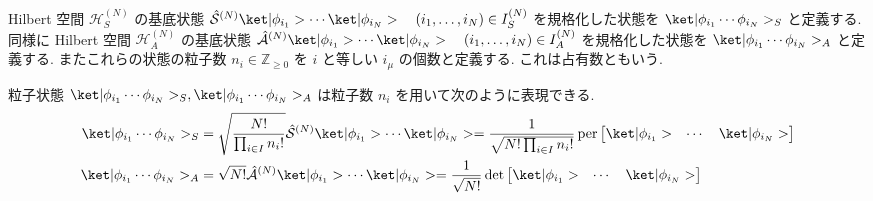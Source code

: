 \documentclass[uplatex,dvipdfmx,a4paper,11pt]{jlreq}
\DeclareMathOperator{\per}{per}
\newcommand{\ZZ}{\mathbb{Z}}
\newcommand{\HH}{\mathcal{H}}
\renewcommand{\S}{\mathcal{S}}
\newcommand{\A}{\mathcal{A}}
\numberwithin{equation}{section}
\theoremstyle{definition}
\begin{document}
\begin{definition}
  Hilbert 空間 $\HH_S^{(N)}$ の基底状態 $\hat{\S}^{(N)}\ket|\phi_{i_1}>\cdots\ket|\phi_{i_N}> \quad (i_1,\ldots,i_N)\in I_S^{(N)}$ を規格化した状態を $\ket|\phi_{i_1}\cdots\phi_{i_N}>_S$ と定義する.
  同様に Hilbert 空間 $\HH_A^{(N)}$ の基底状態 $\hat{\A}^{(N)}\ket|\phi_{i_1}>\cdots\ket|\phi_{i_N}> \quad (i_1,\ldots,i_N)\in I_A^{(N)}$ を規格化した状態を $\ket|\phi_{i_1}\cdots\phi_{i_N}>_A$ と定義する.
  またこれらの状態の粒子数 $n_i\in\ZZ_{\geq 0}$ を $i$ と等しい $i_\mu$ の個数と定義する. これは占有数ともいう.
\end{definition}
\begin{theorem}[Q21-19, Q21-20, Q21-21]
  粒子状態 $\ket|\phi_{i_1}\cdots\phi_{i_N}>_S, \ket|\phi_{i_1}\cdots\phi_{i_N}>_A$ は粒子数 $n_i$ を用いて次のように表現できる.
  \begin{align}
    \ket|\phi_{i_1}\cdots\phi_{i_N}>_S & = \sqrt{\frac{N!}{\prod_{i\in I}n_i!}}\hat{\S}^{(N)}\ket|\phi_{i_1}>\cdots\ket|\phi_{i_N}> = \frac{1}{\sqrt{N!\prod_{i\in I}n_i!}}\per\begin{bmatrix}\ket|\phi_{i_1}> & \cdots & \ket|\phi_{i_N}>\end{bmatrix} \\
    \ket|\phi_{i_1}\cdots\phi_{i_N}>_A & = \sqrt{N!}\hat{\A}^{(N)}\ket|\phi_{i_1}>\cdots\ket|\phi_{i_N}> = \frac{1}{\sqrt{N!}}\det\begin{bmatrix}\ket|\phi_{i_1}> & \cdots & \ket|\phi_{i_N}>\end{bmatrix}
  \end{align}
\end{theorem}
\end{document}
